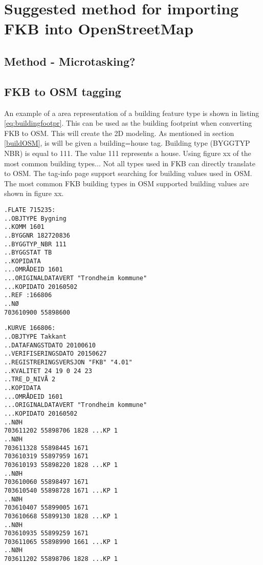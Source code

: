 \chapter{Suggested method for importing FKB into OpenStreetMap}

\section{Method - Microtasking?}



\section{FKB to OSM tagging}

An example of a area representation of a building feature type is shown in listing \ref{eq:buildingfootpr}. This can be used as the building footprint when converting FKB to OSM. This will create the 2D modeling. As mentioned in section \ref{buildOSM}, is will be given a building=house tag. Building type (BYGGTYP NBR) is equal to 111. The value 111 represents a house. Using figure xx of the most common building types... Not all types used in FKB can directly translate to OSM. The tag-info page support searching for building values used in OSM. The most common FKB building types in OSM supported building values are shown in figure xx.

\begin{lstlisting}
.FLATE 715235:
..OBJTYPE Bygning
..KOMM 1601
..BYGGNR 182720836
..BYGGTYP_NBR 111
..BYGGSTAT TB
..KOPIDATA
...OMRÅDEID 1601
...ORIGINALDATAVERT "Trondheim kommune"
...KOPIDATO 20160502
..REF :166806
..NØ
703610900 55898600
\end{lstlisting}

\begin{lstlisting}
.KURVE 166806:
..OBJTYPE Takkant
..DATAFANGSTDATO 20100610
..VERIFISERINGSDATO 20150627
..REGISTRERINGSVERSJON "FKB" "4.01"
..KVALITET 24 19 0 24 23
..TRE_D_NIVÅ 2
..KOPIDATA
...OMRÅDEID 1601
...ORIGINALDATAVERT "Trondheim kommune"
...KOPIDATO 20160502
..NØH
703611202 55898706 1828 ...KP 1  
..NØH
703611328 55898445 1671
703610319 55897959 1671
703610193 55898220 1828 ...KP 1
..NØH
703610060 55898497 1671
703610540 55898728 1671 ...KP 1
..NØH
703610407 55899005 1671
703610668 55899130 1828 ...KP 1
..NØH
703610935 55899259 1671
703611065 55898990 1661 ...KP 1
..NØH
703611202 55898706 1828 ...KP 1
\end{lstlisting}


